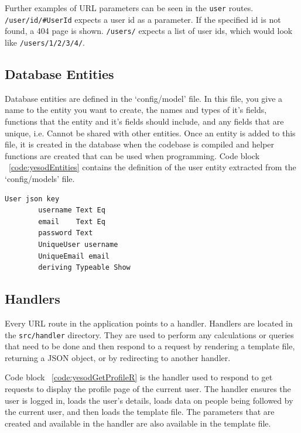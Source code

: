 Further examples of URL parameters can be seen in the \texttt{user} routes. 
\texttt{/user/id/\#UserId} expects a user id as a parameter. If the specified
id is not found, a 404 page is shown. \texttt{/users/\*[UserId]} expects a list
of user ids, which would look like \texttt{/users/1/2/3/4/}.

\subsection{Database Entities}

Database entities are defined in the `config/model' file. In this file, you
give a name to the entity you want to create, the names and types of it's
fields, functions that the entity and it's fields should include, and
any fields that are unique, i.e. Cannot be shared with other entities.
Once an entity is added to this file, it is created in the database
when the codebase is compiled and helper functions are created that
can be used when programming. Code block ~\ref{code:yesodEntities} contains
the definition of the user entity extracted from the `config/models' file.

\begin{lstlisting}[caption={Yesod Database Entities},label={code:yesodEntities}]
    User json key
        username Text Eq
        email    Text Eq
        password Text
        UniqueUser username
        UniqueEmail email
        deriving Typeable Show
\end{lstlisting}

\subsection{Handlers}

Every URL route in the application points to a handler. Handlers are located in
the \texttt{src/handler} directory. They are used to perform any calculations or queries 
that need to be done and then respond to a request by rendering a template file, 
returning a JSON object, or by redirecting to another handler.

Code block ~\ref{code:yesodGetProfileR} is the handler used to respond to get requests
to display the profile page of the current user. The handler ensures the user is logged in,
loads the user's details, loads data on people being followed by the current user,
and then loads the template file. The parameters that are created and available
in the handler are also available in the template file.

